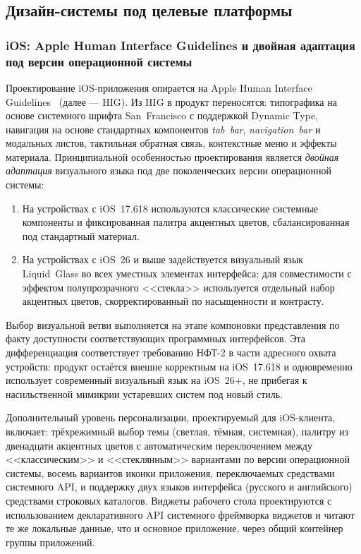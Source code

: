 \subsection{Дизайн-системы под целевые платформы}
\label{subsec:design-systems}

\subsubsection{iOS: Apple Human Interface Guidelines и двойная адаптация под версии операционной системы}
\label{subsubsec:design-ios}

Проектирование iOS-приложения опирается на Apple Human Interface Guidelines~\cite{apple-hig} (далее --- HIG). Из HIG в продукт переносятся: типографика на основе системного шрифта San~Francisco с поддержкой Dynamic Type, навигация на основе стандартных компонентов \emph{tab~bar}, \emph{navigation~bar} и модальных листов, тактильная обратная связь, контекстные меню и эффекты материала. Принципиальной особенностью проектирования является \emph{двойная адаптация} визуального языка под две поколенческих версии операционной системы:

\begin{enumerate}
  \item На устройствах с iOS~17.6\textendash{}18 используются классические системные компоненты и фиксированная палитра акцентных цветов, сбалансированная под стандартный материал.
  \item На устройствах с iOS~26 и выше задействуется визуальный язык Liquid~Glass во всех уместных элементах интерфейса; для совместимости с эффектом полупрозрачного <<стекла>> используется отдельный набор акцентных цветов, скорректированный по насыщенности и контрасту.
\end{enumerate}

Выбор визуальной ветви выполняется на этапе компоновки представления по факту доступности соответствующих программных интерфейсов. Эта дифференциация соответствует требованию НФТ-2 в части адресного охвата устройств: продукт остаётся внешне корректным на iOS~17.6\textendash{}18 и одновременно использует современный визуальный язык на iOS~26+, не прибегая к насильственной мимикрии устаревших систем под новый стиль.

Дополнительный уровень персонализации, проектируемый для iOS-клиента, включает: трёхрежимный выбор темы (светлая, тёмная, системная), палитру из двенадцати акцентных цветов с автоматическим переключением между <<классическим>> и <<стеклянным>> вариантами по версии операционной системы, восемь вариантов иконки приложения, переключаемых средствами системного API, и поддержку двух языков интерфейса (русского и английского) средствами строковых каталогов. Виджеты рабочего стола проектируются с использованием декларативного API системного фреймворка виджетов и читают те же локальные данные, что и основное приложение, через общий контейнер группы приложений.

